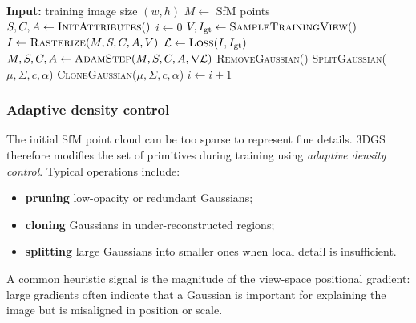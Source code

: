 \documentclass{report}
\begin{document}
\begin{algorithm}[htbp]
\caption{Optimization and Densification}
\label{alg:optimization_densification_3dgs}
\begin{algorithmic}[1]
\State \textbf{Input:} training image size $(w,h)$
\State $M \gets$ SfM points 
\State $S, C, A \gets \textsc{InitAttributes}()$ 
\State $i \gets 0$
    \State $V, I_{\mathrm{gt}} \gets \textsc{SampleTrainingView}()$ 
    \State $I \gets \textsc{Rasterize}(M,S,C,A,V)$ 
    \State $\mathcal{L} \gets \textsc{Loss}(I, I_{\mathrm{gt}})$
    \State $M,S,C,A \gets \textsc{AdamStep}(M,S,C,A,\nabla \mathcal{L})$
                \State \textsc{RemoveGaussian}() 
            \EndIf
                    \State \textsc{SplitGaussian}($\mu,\Sigma,c,\alpha$) 
                \Else
                    \State \textsc{CloneGaussian}($\mu,\Sigma,c,\alpha$) 
                \EndIf
            \EndIf
        \EndFor
    \EndIf
    \State $i \gets i + 1$
\EndWhile
\end{algorithmic}
\end{algorithm}

\subsubsection{Adaptive density control}
The initial SfM point cloud can be too sparse to represent fine details. 3DGS therefore modifies the set of primitives during training using \emph{adaptive density control}. Typical operations include:
\begin{itemize}
    \item \textbf{pruning} low-opacity or redundant Gaussians;
    \item \textbf{cloning} Gaussians in under-reconstructed regions;
    \item \textbf{splitting} large Gaussians into smaller ones when local detail is insufficient.
\end{itemize}
A common heuristic signal is the magnitude of the view-space positional gradient: large gradients often indicate that a Gaussian is important for explaining the image but is misaligned in position or scale.
\end{document}
